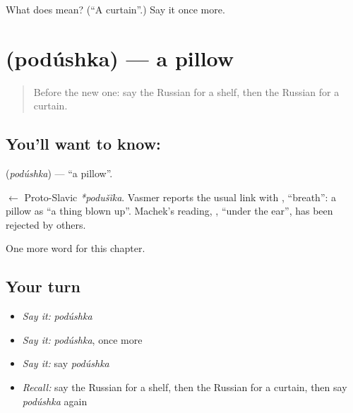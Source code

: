 \begin{tcolorbox}[breakable,colback=teal!4,colframe=teal!35!black,title={Before you move on}]
What does  mean? (\textquotedblleft{}A curtain\textquotedblright{}.) Say it once more.
\end{tcolorbox}
\section[\texorpdfstring{\ru{подушка} (podúshka)}{подушка (podúshka)}]{ (podúshka) — a pillow}

\label{lesson:RU-C95-pillow}



\begin{quote}
Before the new one: say the Russian for a shelf, then the Russian for a curtain.
\end{quote}

\subsection*{You'll want to know: }
\textbf{} (\emph{podúshka}) — \textquotedblleft{}a pillow\textquotedblright{}.

\begin{cousinweb}
\textbf{} $\leftarrow$ Proto-Slavic \emph{*podušĭka}. Vasmer reports the usual link with \emph{}, \textquotedblleft{}breath\textquotedblright{}: a pillow as \textquotedblleft{}a thing blown up\textquotedblright{}. Machek's reading, \emph{ }, \textquotedblleft{}under the ear\textquotedblright{}, has been rejected by others.
\end{cousinweb}

\begin{grammarlens}[title={What you've built}]
One more word for this chapter.
\end{grammarlens}

\subsection*{Your turn}
\begin{itemize}
\raggedright
  \item \emph{Say it:} \emph{podúshka}
  \item \emph{Say it:} \emph{podúshka}, once more
  \item \emph{Say it:} say \emph{podúshka}
  \item \emph{Recall:} say the Russian for a shelf, then the Russian for a curtain, then say \emph{podúshka} again
\end{itemize}

